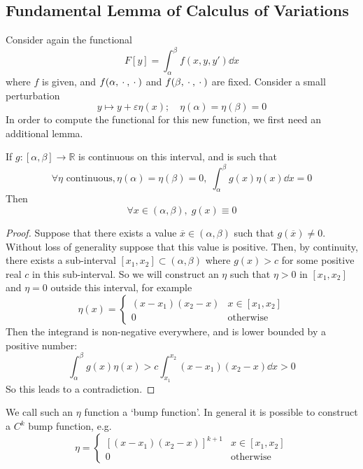 \subsection{Fundamental Lemma of Calculus of Variations}
Consider again the functional
\[
	F[y] = \int_\alpha^\beta f(x, y, y') \dd{x}
\]
where \(f\) is given, and \(f(\alpha, {}\cdot{}, {}\cdot{})\) and \(f(\beta, {}\cdot{}, {}\cdot{})\) are fixed.
Consider a small perturbation
\[
	y \mapsto y + \varepsilon \eta(x);\quad \eta(\alpha) = \eta(\beta) = 0
\]
In order to compute the functional for this new function, we first need an additional lemma.
\begin{lemma}
	If \( g \colon [\alpha, \beta] \to \mathbb R \) is continuous on this interval, and is such that
	\[
		\forall \eta \text{ continuous}, \eta(\alpha) = \eta(\beta) = 0,\; \int_\alpha^\beta g(x) \eta(x) \dd{x} = 0
	\]
	Then
	\[
		\forall x \in (\alpha, \beta),\; g(x) \equiv 0
	\]
\end{lemma}
\begin{proof}
	Suppose that there exists a value \(\overline{x} \in (\alpha, \beta)\) such that \(g(\overline{x}) \neq 0\).
	Without loss of generality suppose that this value is positive.
	Then, by continuity, there exists a sub-interval \([x_1, x_2] \subset (\alpha, \beta)\) where \(g(x) > c\) for some positive real \(c\) in this sub-interval.
	So we will construct an \(\eta\) such that \(\eta > 0\) in \([x_1, x_2]\) and \(\eta = 0\) outside this interval, for example
	\[
		\eta(x) = \begin{cases}
			(x-x_1)(x_2-x) & x \in [x_1, x_2] \\
			0              & \text{otherwise}
		\end{cases}
	\]
	Then the integrand is non-negative everywhere, and is lower bounded by a positive number:
	\[
		\int_\alpha^\beta g(x) \eta(x) > c\int_{x_1}^{x_2} (x-x_1)(x_2-x)\dd{x} > 0
	\]
	So this leads to a contradiction.
\end{proof}
\begin{remark}
	We call such an \(\eta\) function a `bump function'.
	In general it is possible to construct a \(C^k\) bump function, e.g.
	\[
		\eta = \begin{cases}
			[(x-x_1)(x_2-x)]^{k+1} & x \in [x_1, x_2] \\
			0                      & \text{otherwise}
		\end{cases}
	\]
\end{remark}

